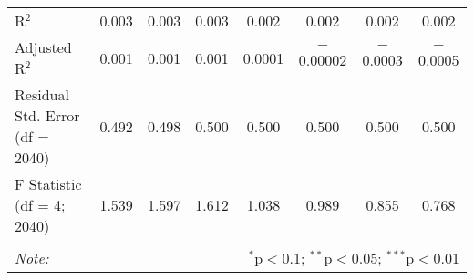 \begin{table}[!htbp]
\begin{tabular}{@{\extracolsep{5pt}}lccccccc}
R$^{2}$ & 0.003 & 0.003 & 0.003 & 0.002 & 0.002 & 0.002 & 0.002 \\ 
Adjusted R$^{2}$ & 0.001 & 0.001 & 0.001 & 0.0001 & $-$0.00002 & $-$0.0003 & $-$0.0005 \\ 
Residual Std. Error (df = 2040) & 0.492 & 0.498 & 0.500 & 0.500 & 0.500 & 0.500 & 0.500 \\ 
F Statistic (df = 4; 2040) & 1.539 & 1.597 & 1.612 & 1.038 & 0.989 & 0.855 & 0.768 \\ 
\hline 
\hline \\[-1.8ex] 
\textit{Note:}  & \multicolumn{7}{r}{$^{*}$p$<$0.1; $^{**}$p$<$0.05; $^{***}$p$<$0.01} \\ 
\end{tabular} 
\end{table} 
